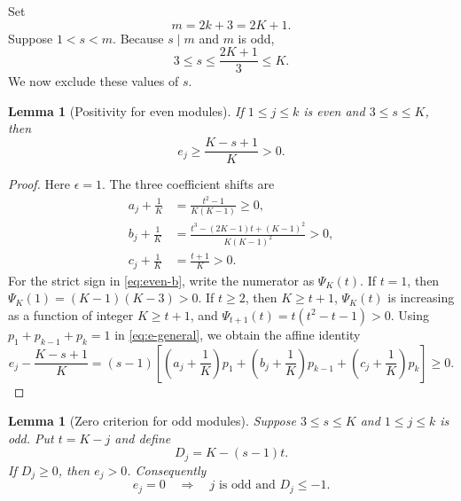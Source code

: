 \documentclass[11pt]{article}
\theoremstyle{plain}
\newtheorem{lemma}[theorem]{Lemma}
\theoremstyle{remark}
\begin{document}
Set
\begin{equation}\label{eq:m}
 m=2k+3=2K+1.
\end{equation}
Suppose $1<s<m$.  Because $s\mid m$ and $m$ is odd,
\begin{equation}\label{eq:small-s-range}
 3\le s\le\frac{2K+1}{3}\le K.
\end{equation}
We now exclude these values of $s$.

\begin{lemma}[Positivity for even modules]\label{lem:T1-even}
If $1\le j\le k$ is even and $3\le s\le K$, then
\begin{equation}\label{eq:T1-even-gap}
 e_j\ge\frac{K-s+1}{K}>0.
\end{equation}
\end{lemma}

\begin{proof}
Here $\epsilon=1$.  The three coefficient shifts are
\begin{align}
 a_j+\frac1K&=\frac{t^2-1}{K(K-1)}\ge0,\label{eq:even-a}\\
 b_j+\frac1K&=
 \frac{t^3-(2K-1)t+(K-1)^2}{K(K-1)^2}>0,\label{eq:even-b}\\
 c_j+\frac1K&=\frac{t+1}{K}>0.\label{eq:even-c}
\end{align}
For the strict sign in \eqref{eq:even-b}, write the numerator as
$\Psi_K(t)$.  If $t=1$, then $\Psi_K(1)=(K-1)(K-3)>0$.  If $t\ge2$, then
$K\ge t+1$, $\Psi_K(t)$ is increasing as a function of integer
$K\ge t+1$, and
$\Psi_{t+1}(t)=t(t^2-t-1)>0$.
Using $p_1+p_{k-1}+p_k=1$ in \eqref{eq:e-general}, we obtain the affine
identity
\begin{equation}\label{eq:T1-even-identity}
 e_j-\frac{K-s+1}{K}
 =(s-1)\left[
 \left(a_j+\frac1K\right)p_1+
 \left(b_j+\frac1K\right)p_{k-1}+
 \left(c_j+\frac1K\right)p_k\right]\ge0.
\end{equation}
\end{proof}

\begin{lemma}[Zero criterion for odd modules]\label{lem:T1-odd}
Suppose $3\le s\le K$ and $1\le j\le k$ is odd.  Put $t=K-j$ and define
\[
 D_j=K-(s-1)t.
\]
If $D_j\ge0$, then $e_j>0$.  Consequently
\begin{equation}\label{eq:zero-criterion}
 e_j=0\quad\Longrightarrow\quad
 j\text{ is odd and }D_j\le-1.
\end{equation}
\end{lemma}
\end{document}

